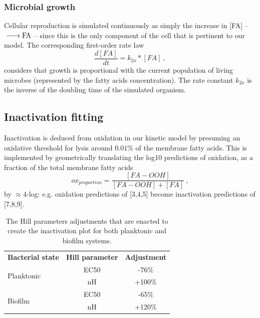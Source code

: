 \subsubsection{Microbial growth}
Cellular reproduction is simulated continuously as simply the increase in [FA] -- $\ce{->FA}$ -- since this is the only component of the cell that is pertinent to our model. The corresponding first-order rate law
\begin{equation}
    \frac{d[FA]}{dt} = k_{2x} * [FA]~,
\end{equation}
considers that growth is proportional with the current population of living microbes (represented by the fatty acids concentration). The rate constant $k_{2x}$ is the inverse of the doubling time of the simulated organism. 

\subsection{Inactivation fitting}

Inactivation is deduced from oxidation in our kinetic model by presuming an oxidative threshold for lysis around $0.01\%$ of the membrane fatty acids. This is implemented by geometrically translating the log10 predictions of oxidation, as a fraction of the total membrane fatty acids
\begin{equation} \label{oxidation_proportion}
    ox_{proportion} = \frac{[FA-OOH]}{[FA-OOH]+[FA]}~,
\end{equation}
by $\approx 4$-log: e.g. oxidation predictions of [3,4,5] become inactivation predictions of [7,8,9]. 

\begin{table}
    \centering
    \begin{tabular}{l|c|c}
        \textbf{Bacterial state} & \textbf{Hill parameter} & \textbf{Adjustment} \\
        \multirow{2}{0}{Planktonic} & EC50 & -76\% \\
         & nH & +100\% \\
         \midrule
         \multirow{2}{0}{Biofilm} & EC50 & -65\% \\
         & nH & +120\% \\
    \end{tabular}
    \caption{
        The Hill parameters adjustments that are enacted to create the inactivation plot for both planktonic and biofilm systems. 
    }
    \label{hill_parameters}
\end{table}

